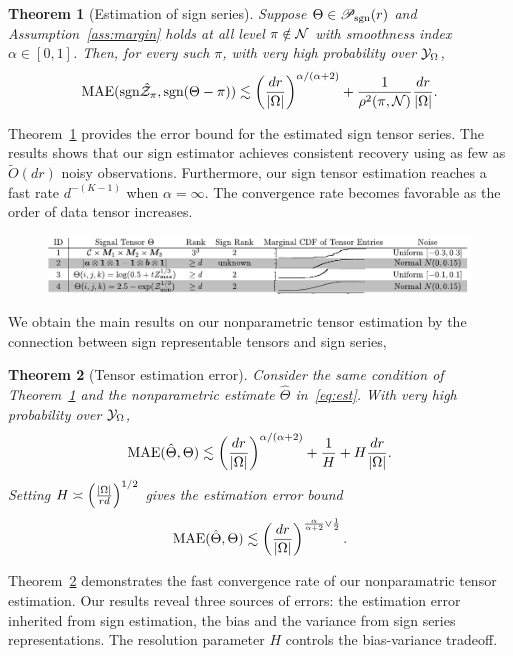 \documentclass{article}
\theoremstyle{plain}
\newtheorem{thm}{Theorem}[section]
\theoremstyle{definition}
\def\sign{\textup{sgn}}
\def\caliP{\mathscr{P}_{\textup{sgn}}}
\begin{document}
 \begin{thm}[Estimation of sign series]\label{thm:classification} Suppose $\Theta\in\caliP(r)$ and Assumption~\ref{ass:margin} holds at all level $\pi\notin \mathcal{N}$ with smoothness index $\alpha\in[0,1]$. Then, for every such $\pi$, with very high probability over $\mathcal{Y}_\Omega$, 
\[
\textup{MAE}(\sign \hat \tZ_\pi, \sign(\Theta-\pi)) \lesssim \left({d r \over |\Omega|}\right)^{\alpha/(\alpha+2)}+{1\over \rho^2(\pi, \tN)} {dr \over |\Omega|}.
\]
\end{thm}
Theorem~\ref{thm:classification} provides the error bound for the estimated sign tensor series. The results shows that our sign estimator achieves consistent recovery using as few as $\tilde O(dr)$ noisy observations. Furthermore, our sign tensor estimation reaches a fast rate $d^{-(K-1)}$ when $\alpha=\infty$. The convergence rate becomes favorable as the order of data tensor increases. 

\begin{figure}[h]
\centering
\includegraphics[width=1\textwidth]{simulation.pdf}
\end{figure}


We obtain the main results on our nonparametric tensor estimation by the connection between sign representable tensors and sign series,
\begin{thm}[Tensor estimation error]\label{thm:estimation} Consider the same condition of Theorem~\ref{thm:classification} and the nonparametric estimate $\hat \Theta$ in~\eqref{eq:est}. With very high probability over $\mathcal{Y}_\Omega$,
\[
\textup{MAE}(\hat \Theta, \Theta)\lesssim \left({d r \over |\Omega|}\right)^{\alpha/(\alpha+2)}+{1\over H}+H{d r \over |\Omega|}.
\]
Setting $H\asymp \left( |\Omega|\over rd\right)^{1/2}$ gives the estimation error bound
\[
\textup{MAE}(\hat \Theta, \Theta)\lesssim \left(dr \over|\Omega|\right)^{{\alpha \over \alpha+2} \vee {1\over 2}}.
\]
\end{thm}
Theorem~\ref{thm:estimation} demonstrates the fast convergence rate of our nonparamatric tensor estimation. Our results reveal three sources of errors: the estimation error inherited from sign estimation, the bias and the variance from sign series representations. The resolution parameter $H$ controls the bias-variance tradeoff.
\end{document}
